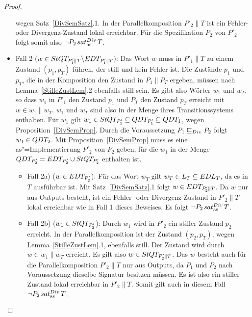 \begin{proof}
\begin{itemize}
      wegen Satz~\ref{DivSemSatz}.1. In der Parallelkomposition $P'_2\|T$ ist
      ein Fehler- oder Divergenz-Zustand lokal erreichbar. Für die
      Spezifikation $P_2$ von $P'_2$ folgt somit also $\neg P_2\hspace{0.05cm}sat_\mathrm{as}^{Div}\hspace{0.05cm} T$.
    \item Fall 2 ($w\in StQT _{P'_1\|T} \backslash EDT _{P'_1\|T}$): Das Wort
      $w$ muss in $P'_1\|T$ zu einem Zustand $(p_1,p_T)$ führen, der still und
      kein Fehler ist. Die Zustände $p_1$ und $p_T$, die in der Komposition den
      Zustand in $P_1\|P_T$ ergeben, müssen nach Lemma~\ref{StilleZustLem}.2
      ebenfalls still sein. Es gibt also Wörter $w_1$ und $w_T$, so dass $w_1$
      in $P'_1$ den Zustand $p_1$ und $P_T$ den Zustand $p_T$ erreicht mit
      $w\in w_1\|w_T$. $w_1$ und $w_T$ sind also in der Menge \StQT{} ihres
      Transitionssystems enthalten. Für $w_1$ gilt $w_1\in StQT _{P'_1}
      \subseteq QDT _{P'_1}\subseteq QDT _1$, wegen
      Proposition~\ref{DivSemProp}. Durch die Voraussetzung $P_1 \sqsubseteq  _{Div} P_2$
      folgt $w_1\in QDT _2$. Mit Proposition~\ref{DivSemProp} muss es eine
      as"=Implementierung $P'_2$ von $P_2$ geben, für die $w_1$ in der Menge
      $QDT _{P'_2} = EDT _{P'_2} \cup StQT _{P'_2}$ enthalten ist.
      \begin{itemize}
        \item Fall 2a) ($w\in EDT _{P'_2}$): Für das Wort $w_T$ gilt $w_T\in L
          _T\subseteq EDL _T$, da es in $T$ ausführbar ist. Mit
          Satz~\ref{DivSemSatz}.1 folgt $w\in EDT _{P'_2\|T}$. Da $w$ nur aus
          Outputs besteht, ist ein Fehler- oder Divergenz-Zustand in $P'_2\|T$
          lokal erreichbar wie in Fall 1 dieses Beweises. Es folgt $\neg P_2
          \hspace{0.05cm}sat_\mathrm{as}^{Div}\hspace{0.05cm} T$.
        \item Fall 2b) ($w_1\in StQT _{P'_2}$): Durch $w_1$ wird in $P'_2$ ein
          stiller Zustand $p_2$ erreicht. In der Parallelkomposition ist der
          Zustand $(p_2,p_T)$, wegen Lemma~\ref{StilleZustLem}.1, ebenfalls
          still. Der Zustand wird durch $w\in w_1\|w_T$ erreicht. Es gilt also
          $w\in StQT _{P'_2\|T}$. Das $w$ besteht auch für die
          Parallelkomposition $P'_2\|T$ nur aus Outputs, da $P_1$ und $P_2$
          nach Voraussetzung dieselbe Signatur besitzen müssen. Es ist also
          ein stiller Zustand lokal erreichbar in $P'_2\|T$. Somit gilt auch in
          diesem Fall $\neg P_2\hspace{0.05cm}sat_\mathrm{as}^{Div}\hspace{0.05cm} T$.
      \end{itemize}
  \end{itemize}
\end{proof}

